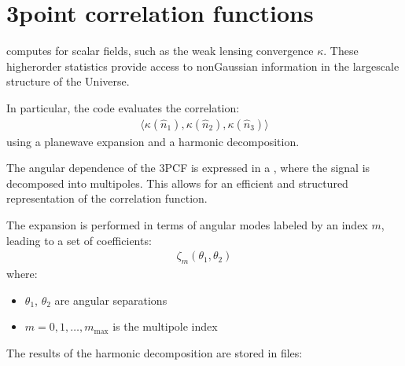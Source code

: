 \documentclass[letterpaper,10pt,english]{sphinxmanual}
\begin{document}
\sphinxstepscope


\chapter{3\sphinxhyphen{}point correlation functions}
\label{\detokenize{3pcf:point-correlation-functions}}\label{\detokenize{3pcf::doc}}
\sphinxAtStartPar
{} computes  for scalar fields, such as the weak lensing convergence \(\kappa\). These higher\sphinxhyphen{}order statistics provide access to non\sphinxhyphen{}Gaussian information in the large\sphinxhyphen{}scale structure of the Universe.

\sphinxAtStartPar
In particular, the code evaluates the correlation:
\begin{equation*}
\begin{split}\langle \kappa(\hat{n}_1),\kappa(\hat{n}_2),\kappa(\hat{n}_3) \rangle\end{split}
\end{equation*}
\sphinxAtStartPar
using a plane\sphinxhyphen{}wave expansion and a harmonic decomposition.

\sphinxAtStartPar
{}

\sphinxAtStartPar
The angular dependence of the 3PCF is expressed in a , where the signal is decomposed into multipoles. This allows for an efficient and structured representation of the correlation function.

\sphinxAtStartPar
The expansion is performed in terms of angular modes labeled by an index \(m\), leading to a set of coefficients:
\begin{equation*}
\begin{split}\zeta_m(\theta_1, \theta_2)\end{split}
\end{equation*}
\sphinxAtStartPar
where:
\begin{itemize}
\item {} 
\sphinxAtStartPar
\(\theta_1\), \(\theta_2\) are angular separations

\item {} 
\sphinxAtStartPar
\(m = 0, 1, \dots, m_{\mathrm{max}}\) is the multipole index

\end{itemize}

\sphinxAtStartPar
{}

\sphinxAtStartPar
The results of the harmonic decomposition are stored in files:
\end{document}
